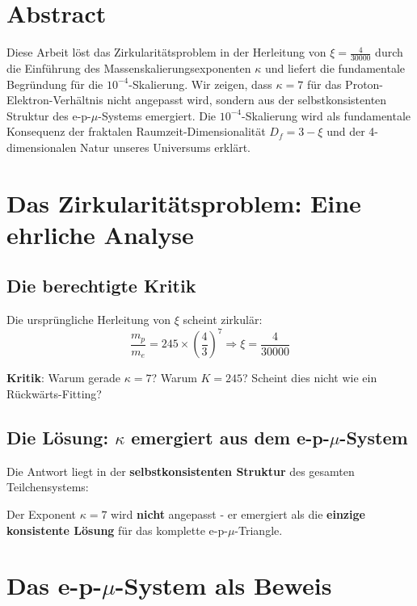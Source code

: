 \section*{Abstract}
		Diese Arbeit löst das Zirkularitätsproblem in der Herleitung von $\xi = \frac{4}{30000}$ durch die Einführung des Massenskalierungsexponenten $\kappa$ und liefert die fundamentale Begründung für die $10^{-4}$-Skalierung. Wir zeigen, dass $\kappa = 7$ für das Proton-Elektron-Verhältnis nicht angepasst wird, sondern aus der selbstkonsistenten Struktur des e-p-$\mu$-Systems emergiert. Die $10^{-4}$-Skalierung wird als fundamentale Konsequenz der fraktalen Raumzeit-Dimensionalität $D_f = 3 - \xi$ und der 4-dimensionalen Natur unseres Universums erklärt.

	
	
	\section{Das Zirkularitätsproblem: Eine ehrliche Analyse}
	
	\subsection{Die berechtigte Kritik}
	
	Die ursprüngliche Herleitung von $\xi$ scheint zirkulär:
	\begin{equation}
		\frac{m_p}{m_e} = 245 \times \left( \frac{4}{3} \right)^7 \Rightarrow \xi = \frac{4}{30000}
	\end{equation}
	
	\textbf{Kritik}: Warum gerade $\kappa = 7$? Warum $K = 245$? Scheint dies nicht wie ein Rückwärts-Fitting?
	
	\subsection{Die Lösung: $\kappa$ emergiert aus dem e-p-$\mu$-System}
	
	Die Antwort liegt in der \textbf{selbstkonsistenten Struktur} des gesamten Teilchensystems:
	
	\begin{tcolorbox}[colback=blue!5!white,colframe=blue!75!black,title={Schlüsselinsight}]
		Der Exponent $\kappa = 7$ wird \textbf{nicht} angepasst - er emergiert als die \textbf{einzige konsistente Lösung} für das komplette e-p-$\mu$-Triangle.
	\end{tcolorbox}
	
	\section{Das e-p-$\mu$-System als Beweis}
	
